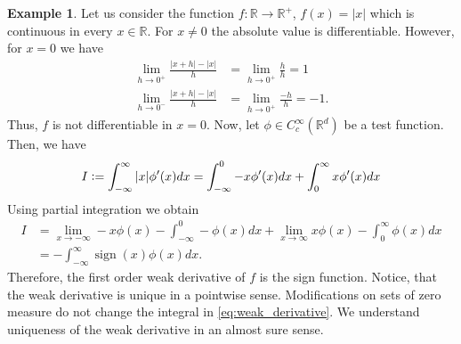 \documentclass[12pt]{article}
\theoremstyle{definition}
\newtheorem{example}[example]{Example}
\numberwithin{equation}{section}
\newcommand{\R}{\mathbb{R}}
\newcommand{\defeq}{\vcentcolon=}
\DeclareMathOperator{\sign}{sign}
\begin{document}
\begin{example}
  Let us consider the function $f : \R \rightarrow \R^+$, $f(x) = |x|$ which is continuous in every $x \in \R$. For $x \neq 0$ the absolute value is differentiable. However, for $x = 0$ we have
  \begin{align*}
    \lim_{h\rightarrow 0^+} \frac{\lvert x + h \rvert - \lvert x \rvert}{h} &= \lim_{h\rightarrow 0^+} \frac{h}{h} = 1 \\
    \lim_{h\rightarrow 0^-} \frac{\lvert x + h \rvert - \lvert x \rvert}{h} &= \lim_{h\rightarrow 0^+} \frac{-h}{h} = -1.
  \end{align*}
  Thus, $f$ is not differentiable in $x = 0$.
  Now, let $\phi \in C_c^{\infty}(\R^d)$ be a test function. Then, we have
  \begin{equation*}
    I \defeq \int_{-\infty}^{\infty}|x|\phi'(x)dx = \int_{-\infty}^{0}-x\phi'(x)dx + \int_{0}^{\infty}x\phi'(x)dx
  \end{equation*}
  Using partial integration we obtain
  \begin{equation*}
    \begin{split}
      I &= \lim_{x \rightarrow -\infty} -x \phi(x) - \int_{-\infty}^{0}-\phi(x)dx + \lim_{x \rightarrow \infty} x \phi(x) - \int_{0}^{\infty}\phi(x)dx \\
      &= -\int_{-\infty}^{\infty}\sign(x)\phi(x)dx.
    \end{split}
  \end{equation*}
  Therefore, the first order weak derivative of $f$ is the sign function. Notice, that the weak derivative is unique in a pointwise sense. Modifications on sets of zero measure do not change the integral in \eqref{eq:weak_derivative}. We understand uniqueness of the weak derivative in an almost sure sense.
\end{example}
\end{document}
